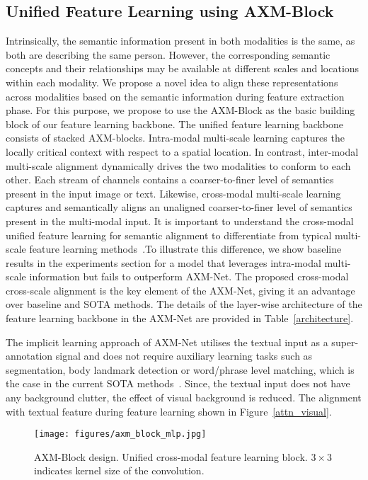 \documentclass[letterpaper]{article} \usepackage{aaai22}  \usepackage{times}  \usepackage{helvet}  \usepackage{courier}  \usepackage[hyphens]{url}  \usepackage{graphicx} \urlstyle{rm} \def\UrlFont{\rm}  \usepackage{natbib}  \usepackage{caption} \DeclareCaptionStyle{ruled}{labelfont=normalfont,labelsep=colon,strut=off} \frenchspacing  \setlength{\pdfpagewidth}{8.5in}  \setlength{\pdfpageheight}{11in}  \usepackage{algorithm}
\begin{document}
\subsection{Unified Feature Learning using AXM-Block}
Intrinsically, the semantic information present in both modalities is the same, as both are describing the same person. However, the corresponding semantic concepts and their relationships may be available at different scales and locations within each modality. We propose a novel idea to align these representations across modalities based on the semantic information during feature extraction phase. For this purpose, we propose to use the AXM-Block as the basic building block of our feature learning backbone. The unified feature learning backbone consists of stacked AXM-blocks. Intra-modal multi-scale learning captures the locally critical context with respect to a spatial location. In contrast, inter-modal multi-scale alignment dynamically drives the two modalities to conform to each other. Each stream of channels contains a coarser-to-finer level of semantics present in the input image or text. Likewise, cross-modal multi-scale learning captures and semantically aligns an unaligned coarser-to-finer level of semantics present in the multi-modal input. It is important to understand the cross-modal unified feature learning for semantic alignment to differentiate from typical multi-scale feature learning methods~\cite{zhou2019omni,chen2017person,cai2019multi}.To illustrate this difference, we show baseline results in the experiments section for a model that leverages intra-modal multi-scale information but fails to outperform AXM-Net. The proposed cross-modal cross-scale alignment is the key element of the AXM-Net, giving it an advantage over baseline and SOTA methods. The details of the layer-wise architecture of the feature learning backbone in the AXM-Net are provided in Table~\ref{architecture}.

The implicit learning approach of AXM-Net utilises the textual input as a super-annotation signal and does not require auxiliary learning tasks such as segmentation, body landmark detection or word/phrase level matching, which is the case in the current SOTA methods~\cite{aggarwal2020text,wang2020vitaa, gumbel2020}. Since, the textual input does not have any background clutter, the effect of visual background is reduced. The alignment with textual feature during feature learning shown in Figure~\ref{attn_visual}.

\begin{figure}
\centering
        \texttt{[image: figures/axm\_block\_mlp.jpg]}
        \footnotesize{\caption{AXM-Block design. Unified cross-modal feature learning block. $3 \times 3$ indicates kernel size of the convolution.}
        \label{axm_block}}
\end{figure}
\end{document}
